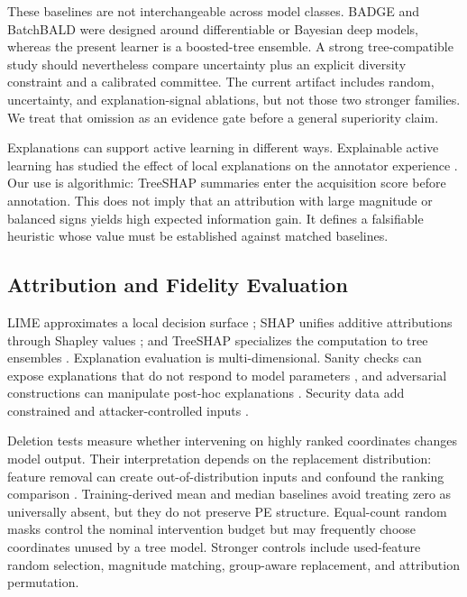 These baselines are not interchangeable across model classes. BADGE and
BatchBALD were designed around differentiable or Bayesian deep models, whereas
the present learner is a boosted-tree ensemble. A strong tree-compatible study
should nevertheless compare uncertainty plus an explicit diversity constraint
and a calibrated committee. The current artifact includes random, uncertainty,
and explanation-signal ablations, but not those two stronger families. We treat
that omission as an evidence gate before a general superiority claim.

Explanations can support active learning in different ways. Explainable active
learning has studied the effect of local explanations on the annotator
experience \cite{ghai2021explainable}. Our use is algorithmic: TreeSHAP summaries
enter the acquisition score before annotation. This does not imply that an
attribution with large magnitude or balanced signs yields high expected
information gain. It defines a falsifiable heuristic whose value must be
established against matched baselines.

\subsection{Attribution and Fidelity Evaluation}

LIME approximates a local decision surface \cite{ribeiro2016why}; SHAP unifies
additive attributions through Shapley values \cite{lundberg2017unified}; and
TreeSHAP specializes the computation to tree ensembles
\cite{lundberg2020local}. Explanation evaluation is multi-dimensional. Sanity
checks can expose explanations that do not respond to model parameters
\cite{adebayo2018sanity}, and adversarial constructions can manipulate
post-hoc explanations \cite{slack2020fooling}. Security data add constrained and
attacker-controlled inputs \cite{warnecke2020evaluating}.

Deletion tests measure whether intervening on highly ranked coordinates changes
model output. Their interpretation depends on the replacement distribution:
feature removal can create out-of-distribution inputs and confound the ranking
comparison \cite{hooker2019benchmark,yeh2019infidelity}. Training-derived mean
and median baselines avoid treating zero as universally absent, but they do not
preserve PE structure. Equal-count random masks control the nominal intervention
budget but may frequently choose coordinates unused by a tree model. Stronger
controls include used-feature random selection, magnitude matching, group-aware
replacement, and attribution permutation.

